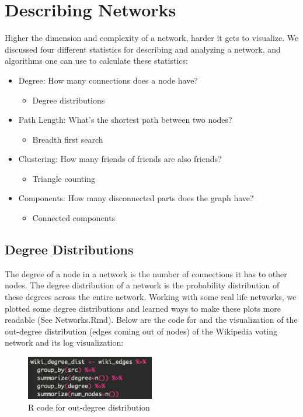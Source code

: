 \section{Describing Networks}
Higher the dimension and complexity of a network, harder it gets to visualize. We discussed four different statistics for describing and analyzing a network, and algorithms one can use to calculate these statistics:
\begin{itemize}
  \item Degree: How many connections does a node have?
  \begin{itemize}
    \item Degree distributions
  \end{itemize}
  \item Path Length: What's the shortest path between two nodes?
  \begin{itemize}
    \item Breadth first search
  \end{itemize}
  \item Clustering: How many friends of friends are also friends?
  \begin{itemize}
    \item Triangle counting
  \end{itemize}
  \item Components: How many disconnected parts does the graph have?
  \begin{itemize}
    \item Connected components
  \end{itemize}
\end{itemize}

\subsection{Degree Distributions}
The degree of a node in a network is the number of connections it has to other nodes. The degree distribution of a network is the probability distribution of these degrees across the entire network. Working with some real life networks, we plotted some degree distributions and learned ways to make these plots more readable (See Networks.Rmd). Below are the code for and the visualization of the out-degree distribution (edges coming out of nodes) of the Wikipedia voting network and its log visualization: 

\begin{figure}[ht]
  \begin{center}
    \includegraphics[width=0.5\textwidth]{figures/deg-dist.png}
    \caption{R code for out-degree distribution}
    \label{fig:deg-dist}
  \end{center}
\end{figure}

